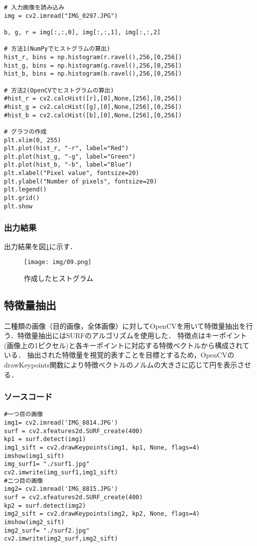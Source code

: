\documentclass{article}
\begin{document}
\begin{lstlisting}
# 入力画像を読み込み
img = cv2.imread("IMG_0297.JPG")
    
b, g, r = img[:,:,0], img[:,:,1], img[:,:,2]

# 方法1(NumPyでヒストグラムの算出)
hist_r, bins = np.histogram(r.ravel(),256,[0,256])
hist_g, bins = np.histogram(g.ravel(),256,[0,256])
hist_b, bins = np.histogram(b.ravel(),256,[0,256])

# 方法2(OpenCVでヒストグラムの算出)
#hist_r = cv2.calcHist([r],[0],None,[256],[0,256])
#hist_g = cv2.calcHist([g],[0],None,[256],[0,256])
#hist_b = cv2.calcHist([b],[0],None,[256],[0,256])

# グラフの作成
plt.xlim(0, 255)
plt.plot(hist_r, "-r", label="Red")
plt.plot(hist_g, "-g", label="Green")
plt.plot(hist_b, "-b", label="Blue")
plt.xlabel("Pixel value", fontsize=20)
plt.ylabel("Number of pixels", fontsize=20)
plt.legend()
plt.grid()
plt.show
\end{lstlisting}

\subsubsection{出力結果}

出力結果を図\ref{09}に示す．

\begin{figure}[H]
\centering
\texttt{[image: img/09.png]}
\caption{作成したヒストグラム}
\label{09}
\end{figure}

\subsection{特徴量抽出}

二種類の画像（目的画像，全体画像）に対してOpenCVを用いて特徴量抽出を行う．特徴量抽出にはSURFのアルゴリズムを使用した．
特徴点はキーポイント(画像上の1ピクセル)と各キーポイントに対応する特徴ベクトルから構成されている．
抽出された特徴量を視覚的表すことを目標とするため，OpenCVのdrawKeypoints関数により特徴ベクトルのノルムの大きさに応じて円を表示させる．

\subsubsection{ソースコード}

\begin{lstlisting}
#一つ目の画像
img1= cv2.imread('IMG_8814.JPG')
surf = cv2.xfeatures2d.SURF_create(400)
kp1 = surf.detect(img1)
img1_sift = cv2.drawKeypoints(img1, kp1, None, flags=4)
imshow(img1_sift)
img_surf1= "./surf1.jpg"
cv2.imwrite(img_surf1,img1_sift)
#二つ目の画像
img2= cv2.imread('IMG_8815.JPG')
surf = cv2.xfeatures2d.SURF_create(400)
kp2 = surf.detect(img2)
img2_sift = cv2.drawKeypoints(img2, kp2, None, flags=4)
imshow(img2_sift)
img2_surf= "./surf2.jpg"
cv2.imwrite(img2_surf,img2_sift)
\end{lstlisting}
\end{document}
